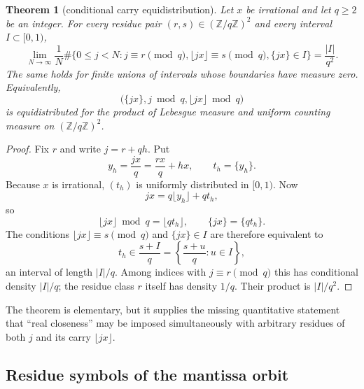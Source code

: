 \documentclass[11pt,oneside]{article}
\newtheorem{theorem}{Theorem}[section]
\theoremstyle{definition}
\theoremstyle{remark}
\newcommand{\Z}{\mathbb{Z}}
\begin{document}
\begin{theorem}[conditional carry equidistribution]\label{thm:carry-UD}
Let $x$ be irrational and let $q\ge2$ be an integer.  For every residue pair
$(r,s)\in(\Z/q\Z)^2$ and every interval $I\subset[0,1)$,
\begin{equation}\label{eq:carry-density}
 \lim_{N\to\infty}\frac1N
 \#\{0\le j<N:
      j\equiv r\pmod q,
      \lfloor jx\rfloor\equiv s\pmod q,
      \{jx\}\in I\}
 =\frac{|I|}{q^2}.
\end{equation}
The same holds for finite unions of intervals whose boundaries have measure
zero.  Equivalently,
\[
 \bigl(\{jx\},j\bmod q,\lfloor jx\rfloor\bmod q\bigr)
\]
is equidistributed for the product of Lebesgue measure and uniform counting
measure on $(\Z/q\Z)^2$.
\end{theorem}

\begin{proof}
Fix $r$ and write $j=r+q h$.  Put
\[
 y_h=\frac{jx}{q}=\frac{rx}{q}+hx,
 \qquad t_h=\{y_h\}.
\]
Because $x$ is irrational, $(t_h)$ is uniformly distributed in $[0,1)$.
Now
\[
 jx=q\lfloor y_h\rfloor+q t_h,
\]
so
\[
 \lfloor jx\rfloor\bmod q=\lfloor q t_h\rfloor,
 \qquad \{jx\}=\{q t_h\}.
\]
The conditions $\lfloor jx\rfloor\equiv s\pmod q$ and $\{jx\}\in I$ are
therefore equivalent to
\[
 t_h\in\frac{s+I}{q}
   =\left\{\frac{s+u}{q}:u\in I\right\},
\]
an interval of length $|I|/q$.  Among indices with $j\equiv r\pmod q$ this
has conditional density $|I|/q$; the residue class $r$ itself has density
$1/q$.  Their product is $|I|/q^2$.
\end{proof}

The theorem is elementary, but it supplies the missing quantitative statement
that ``real closeness'' may be imposed simultaneously with arbitrary residues
of both $j$ and its carry $\lfloor jx\rfloor$.

\subsection{Residue symbols of the mantissa orbit}
\end{document}
